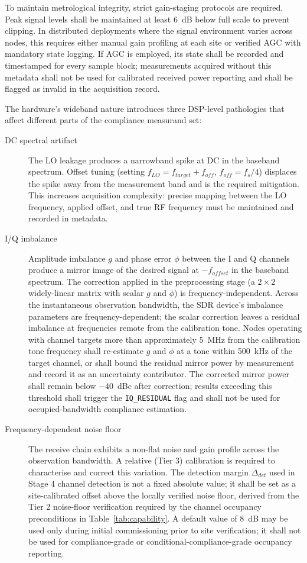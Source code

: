 \documentclass[11pt]{article}
\begin{document}
To maintain metrological integrity, strict gain-staging protocols are required. Peak signal levels shall be maintained at least 6~dB below full scale to prevent clipping. In distributed deployments where the signal environment varies across nodes, this requires either manual gain profiling at each site or verified AGC with mandatory state logging. If AGC is employed, its state shall be recorded and timestamped for every sample block; measurements acquired without this metadata shall not be used for calibrated received power reporting and shall be flagged as invalid in the acquisition record.

The hardware's wideband nature introduces three DSP-level pathologies that affect different parts of the compliance measurand set:

\begin{description}

\item[DC spectral artifact] The LO leakage produces a narrowband spike at DC in the baseband spectrum. Offset tuning (setting $f_{LO} = f_{target} + f_{off}$, $f_{off} = f_s/4$) displaces the spike away from the measurement band and is the required mitigation. This increases acquisition complexity: precise mapping between the LO frequency, applied offset, and true RF frequency must be maintained and recorded in metadata.

\item[I/Q imbalance] Amplitude imbalance $g$ and phase error $\phi$ between the I and Q channels produce a mirror image of the desired signal at $-f_{offset}$ in the baseband spectrum. The correction applied in the preprocessing stage (a $2 \times 2$ widely-linear matrix with scalar $g$ and $\phi$) is frequency-independent. Across the instantaneous observation bandwidth, the SDR device's imbalance parameters are frequency-dependent; the scalar correction leaves a residual imbalance at frequencies remote from the calibration tone. Nodes operating with channel targets more than approximately 5~MHz from the calibration tone frequency shall re-estimate $g$ and $\phi$ at a tone within 500~kHz of the target channel, or shall bound the residual mirror power by measurement and record it as an uncertainty contributor. The corrected mirror power shall remain below $-40$~dBc after correction; results exceeding this threshold shall trigger the \texttt{IQ\_RESIDUAL} flag and shall not be used for occupied-bandwidth compliance estimation.

\item[Frequency-dependent noise floor] The receive chain exhibits a non-flat noise and gain profile across the observation bandwidth. A relative (Tier 3) calibration is required to characterise and correct this variation. The detection margin $\Delta_{det}$ used in Stage 4 channel detection is not a fixed absolute value; it shall be set as a site-calibrated offset above the locally verified noise floor, derived from the Tier 2 noise-floor verification required by the channel occupancy preconditions in Table~\ref{tab:capability}. A default value of 8~dB may be used only during initial commissioning prior to site verification; it shall not be used for compliance-grade or conditional-compliance-grade occupancy reporting.


\end{description}
\end{document}
